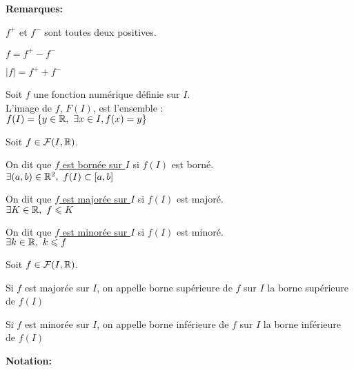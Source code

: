 \documentclass[12pt,twoside,a4paper]{article}
\begin{document}
			\begin{flushleft}
				\textbf{Remarques:}
				\begin{lsite}
					\item $f^{+}$ et $f^{-}$ sont toutes deux positives.
					\item $f=f^{+}-f^{-}$
					\item $|f|=f^{+}+f^{-}$
				\end{lsite}
			\end{flushleft}
			\begin{defi}
				Soit $f$ une fonction numérique définie sur $I$.\\
				L'image de $f$, $F(I)$, est l'ensemble :\\
				$f(I)=\{y\in \mathbb{R},\ \exists x\in I, f(x)=y \}$
			\end{defi}
			\begin{defi}
				Soit $f\in \mathcal{F}(I,\mathbb{R})$.
				\begin{liste}
					\item On dit que \underline{$f$ est bornée sur $I$} si $f(I)$ est borné.\\
						$\exists(a,b)\in \mathbb{R}^{2},\ f(I)\subset [a,b]$
					\item On dit que \underline{$f$ est majorée sur $I$} si $f(I)$ est majoré.\\
						$\exists K\in\mathbb{R},\ f \leqslant K$
					\item On dit que \underline{$f$ est minorée sur $I$} si $f(I)$ est minoré.\\
						$\exists k\in\mathbb{R},\ k\leqslant f$
				\end{liste}
			\end{defi}
			\begin{defi}
				Soit $f\in \mathcal{F}(I,\mathbb{R})$.
				\begin{liste}
					\item Si $f$ est majorée sur $I$, on appelle borne supérieure de $f$ sur $I$ la borne supérieure de $f(I)$
					\item Si $f$ est minorée sur $I$, on appelle borne inférieure de $f$ sur $I$ la borne inférieure de $f(I)$
				\end{liste}
			\end{defi}
			\begin{flushleft}
				\textbf{Notation:} %
			\end{flushleft}
\end{document}
